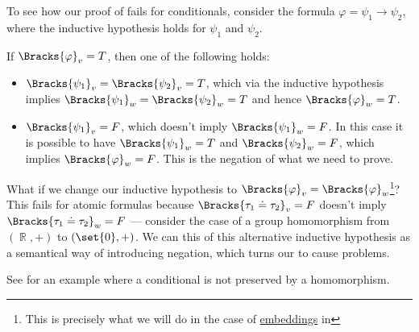\begin{example}\label{ex:thm:positive_formulas_preserved_under_homomorphism/proof_failure}
  To see how our proof of  fails for conditionals, consider the formula \( \varphi = \psi_1 \rightarrow \psi_2 \), where the inductive hypothesis holds for \( \psi_1 \) and \( \psi_2 \).

  If \( \Bracks{\varphi}_v = T \), then one of the following holds:
  \begin{itemize}
    \item \( \Bracks{\psi_1}_v = \Bracks{\psi_2}_v = T \), which via the inductive hypothesis implies \( \Bracks{\psi_1}_w = \Bracks{\psi_2}_w = T \) and hence \( \Bracks{\varphi}_w = T \).
    \item \( \Bracks{\psi_1}_v = F \), which doesn't imply \( \Bracks{\psi_1}_w = F \). In this case it is possible to have \( \Bracks{\psi_1}_w = T \) and \( \Bracks{\psi_2}_w = F \), which implies \( \Bracks{\varphi}_w = F \). This is the negation of what we need to prove.
  \end{itemize}

  What if we change our inductive hypothesis to \( \Bracks{\varphi}_v = \Bracks{\varphi}_w \)\footnote{This is precisely what we will do in the case of \hyperref[def:first_order_embedding]{embeddings} in }? This fails for atomic formulas because \( \Bracks{\tau_1 \doteq \tau_2}_v = F \) doesn't imply \( \Bracks{\tau_1 \doteq \tau_2}_w = F \) --- consider the case of a group homomorphism from \( (\BbbR, +) \) to \( (\set{ 0 }, +) \). We can this of this alternative inductive hypothesis as a semantical way of introducing negation, which turns our to cause problems.

  See  for an example where a conditional is not preserved by a homomorphism.
\end{example}

